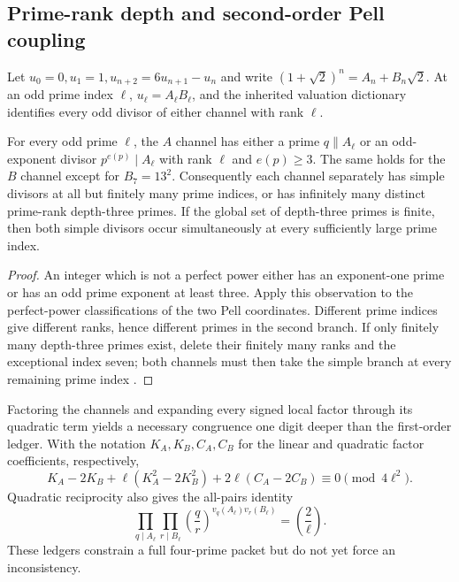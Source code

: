 \subsection{Prime-rank depth and second-order Pell coupling}

Let $u_0=0,u_1=1,u_{n+2}=6u_{n+1}-u_n$ and write
$(1+\sqrt2)^n=A_n+B_n\sqrt2$.  At an odd prime index $\ell$,
$u_\ell=A_\ell B_\ell$, and the inherited valuation dictionary identifies
every odd divisor of either channel with rank $\ell$.

\begin{theorem}
\label{thm:hdd-channel-escape}
For every odd prime $\ell$, the $A$ channel has either a prime
$q\parallel A_\ell$ or an odd-exponent divisor $p^{e(p)}\mid A_\ell$ with
rank $\ell$ and $e(p)\geq3$.  The same holds for the $B$ channel except for
$B_7=13^2$.  Consequently each channel separately has simple divisors at all
but finitely many prime indices, or has infinitely many distinct prime-rank
depth-three primes.  If the global set of depth-three primes is finite, then
both simple divisors occur simultaneously at every sufficiently large prime
index.
\end{theorem}

\begin{proof}
An integer which is not a perfect power either has an exponent-one prime or
has an odd prime exponent at least three.  Apply this observation to the
perfect-power classifications of the two Pell coordinates.  Different prime
indices give different ranks, hence different primes in the second branch.
If only finitely many depth-three primes exist, delete their finitely many
ranks and the exceptional index seven; both channels must then take the
simple branch at every remaining prime index
\cite{Cohn1996Pell,Cohn2003Pell,Ljunggren1942}.
\end{proof}

Factoring the channels and expanding every signed local factor through its
quadratic term yields a necessary congruence one digit deeper than the
first-order ledger.  With the notation $K_A,K_B,C_A,C_B$ for the linear and
quadratic factor coefficients, respectively,
\begin{equation}\label{eq:hdd-second-order}
 K_A-2K_B+\ell(K_A^2-2K_B^2)
       +2\ell(C_A-2C_B)\equiv0\pmod{4\ell^2}.
\end{equation}
Quadratic reciprocity also gives the all-pairs identity
\[
 \prod_{q\mid A_\ell}\prod_{r\mid B_\ell}
       \left(\frac qr\right)^{v_q(A_\ell)v_r(B_\ell)}
       =\left(\frac2\ell\right).
\]
These ledgers constrain a full four-prime packet but do not yet force an
inconsistency.

